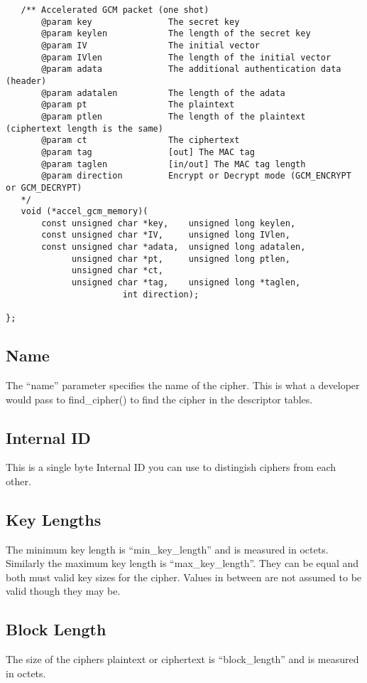 \documentclass[a4paper]{book}
\begin{document}
\begin{small}
\begin{verbatim}
   /** Accelerated GCM packet (one shot)
       @param key               The secret key
       @param keylen            The length of the secret key
       @param IV                The initial vector 
       @param IVlen             The length of the initial vector
       @param adata             The additional authentication data (header)
       @param adatalen          The length of the adata
       @param pt                The plaintext
       @param ptlen             The length of the plaintext (ciphertext length is the same)
       @param ct                The ciphertext
       @param tag               [out] The MAC tag
       @param taglen            [in/out] The MAC tag length
       @param direction         Encrypt or Decrypt mode (GCM_ENCRYPT or GCM_DECRYPT)
   */
   void (*accel_gcm_memory)(
       const unsigned char *key,    unsigned long keylen,
       const unsigned char *IV,     unsigned long IVlen,
       const unsigned char *adata,  unsigned long adatalen,
             unsigned char *pt,     unsigned long ptlen,
             unsigned char *ct, 
             unsigned char *tag,    unsigned long *taglen,
                       int direction);

};
\end{verbatim}
\end{small}

\subsection{Name}
The ``name'' parameter specifies the name of the cipher.  This is what a developer would pass to find\_cipher() to find the cipher in the descriptor
tables.

\subsection{Internal ID}
This is a single byte Internal ID you can use to distingish ciphers from each other.

\subsection{Key Lengths}
The minimum key length is ``min\_key\_length'' and is measured in octets.  Similarly the maximum key length is ``max\_key\_length''.  They can be equal
and both must valid key sizes for the cipher.  Values in between are not assumed to be valid though they may be.

\subsection{Block Length}
The size of the ciphers plaintext or ciphertext is ``block\_length'' and is measured in octets.
\end{document}
